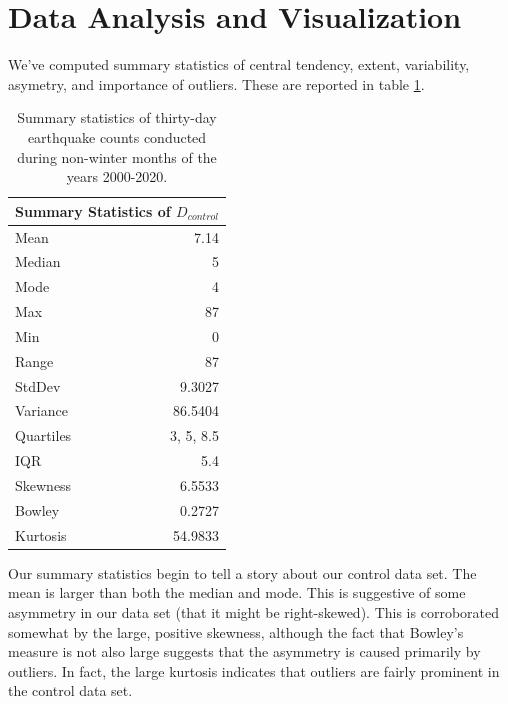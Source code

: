 \documentclass{amsart}
\begin{document}
\section{Data Analysis and Visualization}
We've computed summary statistics of central tendency, extent, variability, asymetry, and importance of outliers. These are reported in table \ref{Tbl:statistics}.
\begin{table}[h]
\centering
\begin{tabular}{lr}
\toprule
\multicolumn{2}{c}{\textbf{Summary Statistics of $D_{control}$}}\\
\midrule
Mean & 7.14 \\
Median& 5\\
Mode& 4\\
Max& 87\\
Min& 0\\
Range& 87\\
StdDev& 9.3027\\
Variance& 86.5404\\
Quartiles& 3, 5, 8.5\\
IQR& 5.4\\
Skewness& 6.5533\\
Bowley& 0.2727\\
Kurtosis& 54.9833\\
\bottomrule
\end{tabular}
\caption{Summary statistics of thirty-day earthquake counts conducted during non-winter months of the years 2000-2020.\label{Tbl:statistics}}
\end{table}
Our summary statistics begin to tell a story about our control data set. The mean is larger than both the median and mode. This is suggestive of some asymmetry in our data set (that it might be right-skewed). This is corroborated somewhat by the large, positive skewness, although the fact that Bowley's measure is not also large suggests that the asymmetry is caused primarily by outliers. In fact, the large kurtosis indicates that outliers are fairly prominent in the control data set.
\end{document}
